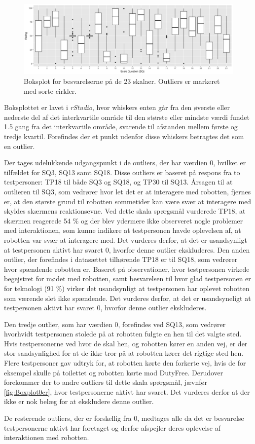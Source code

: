 %
\begin{figure}[H]
\centering
\includegraphics[width = \textwidth]{Figure/DatabehandlingSkalaer/Boksplot0er} 
\caption{Boksplot for besvarelserne på de 23 skalaer. Outliers er markeret med sorte cirkler.}
\label{fig:Boxplot0er}
\end{figure}
\noindent
%
Boksplottet er lavet i \textit{rStudio}, hvor whiskers enten går fra den øverste eller nederste del af det interkvartile område til den største eller mindste værdi fundet 1.5 gang fra det interkvartile område, svarende til afstanden mellem første og tredje kvartil. Forefindes der et punkt udenfor disse whiskers betragtes det som en outlier.

Der tages udelukkende udgangspunkt i de outliers, der har værdien 0, hvilket er tilfældet for SQ3, SQ13 samt SQ18. Disse outliers er baseret på respons fra to testpersoner: TP18 til både SQ3 og SQ18, og TP30 til SQ13. Årsagen til at outlieren til SQ3, som vedrører hvor let det er at interagere med robotten, fjernes er, at den største grund til robotten sommetider kan være svær at interagere med skyldes skærmens reaktionsevne. Ved dette skala spørgsmål vurderede TP18, at skærmen reagerede 54 \% og der blev ydermere ikke observeret nogle problemer med interaktionen, som kunne indikere at testpersonen havde oplevelsen af, at robotten var svær at interagere med. Det vurderes derfor, at det er usandsynligt at testpersonen aktivt har svaret 0, hvorfor denne outlier ekskluderes. Den anden outlier, der forefindes i datasættet tilhørende TP18 er til SQ18, som vedrører hvor spændende robotten er. Baseret på observationer, hvor testpersonen virkede begejstret for mødet med robotten, samt besvarelsen til hvor glad testpersonen er for teknologi (91 \%) virker det usandsynligt at testpersonen har oplevet robotten som værende slet ikke spændende. Det vurderes derfor, at det er usandsyneligt at testpersonen aktivt har svaret 0, hvorfor denne outlier ekskluderes.

Den tredje outlier, som har værdien 0, forefindes ved SQ13, som vedrører hvorhvidt testpersonen stolede på at robotten fulgte en hen til det valgte sted. Hvis testpersonerne ved hvor de skal hen, og robotten kører en anden vej, er der stor sandsynlighed for at de ikke tror på at robotten kører det rigtige sted hen. Flere testpersoner gav udtryk for, at robotten kørte den forkerte vej, hvis de for eksempel skulle på toilettet og robotten kørte mod DutyFree. Derudover forekommer der to andre outliers til dette skala spørgsmål, jævnfør \autoref{fig:Boxplot0er}, hvor testpersonerne aktivt har svaret. Det vurderes derfor at der ikke er nok belæg for at ekskludere denne outlier. 

De resterende outliers, der er forskellig fra 0, medtages alle da det er besvarelse testpersonerne aktivt har foretaget og derfor afspejler deres oplevelse af interaktionen med robotten.  
